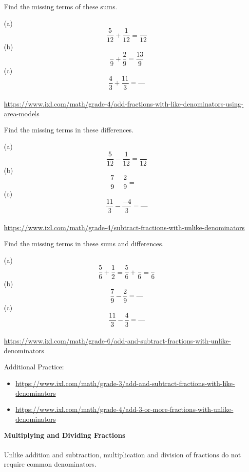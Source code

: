 \begin{exercise}
	Find the missing terms of these sums. 

	(a)	\[\frac{5}{12} + \frac{1}{12} = \frac{ }{12} \]
	(b)	\[\frac{ }{9} + \frac{2}{9} = \frac{13}{9} \]
	(c)	\[\frac{4}{3} + \frac{11}{3} = \text{---} \]
\\ 
	{\footnotesize \url{https://www.ixl.com/math/grade-4/add-fractions-with-like-denominators-using-area-models}}
\end{exercise} 
\begin{exercise}
	Find the missing terms in these differences.  
	
	(a)	\[\frac{5}{12} - \frac{1}{12} = \frac{}{12} \]
	(b)	\[\frac{7}{9} - \frac{2}{9} = \text{---}  \]
	(c)	\[\frac{11}{3} - \frac{-4}{3} = \text{---} \]
\\ 
	{\footnotesize \url{https://www.ixl.com/math/grade-4/subtract-fractions-with-unlike-denominators}}
\end{exercise} 
\begin{exercise}
	Find the missing terms in these sums and differences.  
	
	(a)	\[\frac{5}{6} + \frac{1}{2} = \frac{5}{6} + \frac{}{6} = \frac{}{6} \]
	(b)	\[\frac{7}{9} - \frac{2}{9} = \text{---}  \]
	(c)	\[\frac{11}{3} - \frac{4}{3} = \text{---} \]
\\ 	
	{\footnotesize \url{https://www.ixl.com/math/grade-6/add-and-subtract-fractions-with-unlike-denominators}}
\end{exercise} 
Additional Practice: 
\begin{itemize}
	\item {\footnotesize \url{https://www.ixl.com/math/grade-3/add-and-subtract-fractions-with-like-denominators}}
	\item {\footnotesize \url{https://www.ixl.com/math/grade-4/add-3-or-more-fractions-with-unlike-denominators}}
\end{itemize}





\newpage 
\textbf{Multiplying and Dividing Fractions}
\\ \\ 
Unlike addition and subtraction, multiplication and division of fractions do not require common denominators.  





